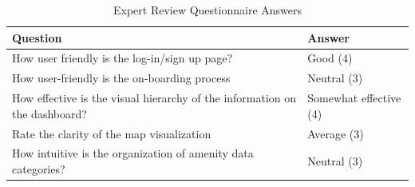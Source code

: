 \documentclass{report}
\begin{document}
\begin{table}[h!]
    \centering
    \caption{Expert Review Questionnaire Answers}
    \label{tab:table4}
    \begin{tabularx}{\textwidth}{|p{}|X|}
        \hline
        \textbf{Question}                                                                                                        & \textbf{Answer}                                                                                                                                                                                                       \\ \hline
        How user friendly is the log-in/sign up page?                                                                            & Good (4)                                                                                                                                                                                                              \\ \hline
        How user-friendly is the on-boarding process                                                                             & Neutral (3)                                                                                                                                                                                                           \\ \hline
        How effective is the visual hierarchy of the information on the dashboard?                                               & Somewhat effective (4)                                                                                                                                                                                                \\ \hline
        Rate the clarity of the map visualization                                                                                & Average (3)                                                                                                                                                                                                           \\ \hline
        How intuitive is the organization of amenity data categories?                                                            & Neutral (3)                                                                                                                                                                                                           \\ \hline

\end{tabularx}
\end{table}
\end{document}
